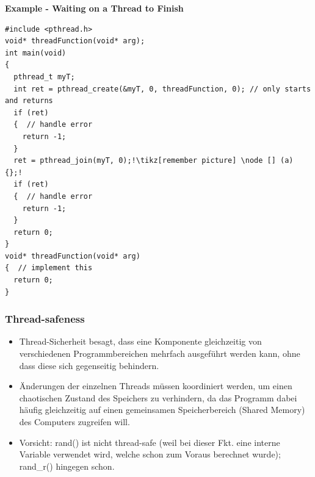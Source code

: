 
\textbf{Example - Waiting on a Thread to Finish}
\begin{lstlisting}[style=C, escapechar=!]
#include <pthread.h>
void* threadFunction(void* arg);
int main(void)
{
  pthread_t myT;
  int ret = pthread_create(&myT, 0, threadFunction, 0); // only starts and returns
  if (ret)
  {  // handle error
    return -1;
  }
  ret = pthread_join(myT, 0);!\tikz[remember picture] \node [] (a) {};!
  if (ret)
  {  // handle error
    return -1;
  }
  return 0;
}
void* threadFunction(void* arg)
{  // implement this
  return 0;
}
\end{lstlisting}
%

\subsubsection{Thread-safeness}
\begin{itemize}
  \item Thread-Sicherheit besagt, dass eine Komponente gleichzeitig von verschiedenen Programmbereichen mehrfach ausgeführt werden kann, ohne dass diese sich gegenseitig behindern.
  \item Änderungen der einzelnen Threads müssen koordiniert werden, um einen chaotischen Zustand des Speichers zu verhindern, da das Programm dabei häufig gleichzeitig auf einen gemeinsamen Speicherbereich (Shared Memory) des Computers zugreifen will.
  \item Vorsicht: rand() ist nicht thread-safe (weil bei dieser Fkt. eine interne Variable verwendet wird, welche schon zum Voraus berechnet wurde); rand\_r() hingegen schon.
\end{itemize}


